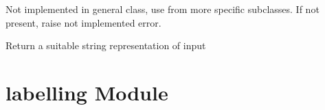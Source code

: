 \documentclass[letterpaper,10pt,english]{sphinxmanual}
\begin{document}
\begin{fulllineitems}
\begin{fulllineitems}
\label{file_processing:file_processing.ProcessFiles.score_all_sentences}
Not implemented in general class, use from more specific subclasses.
If not present, raise not implemented error.

\end{fulllineitems}


\begin{fulllineitems}
\label{file_processing:file_processing.ProcessFiles.transform_contents}
Return a suitable string representation of
input

\end{fulllineitems}


\end{fulllineitems}



\chapter{labelling Module}
\label{labelling::doc}\label{labelling:module-labelling}\label{labelling:labelling-module}
\end{document}
